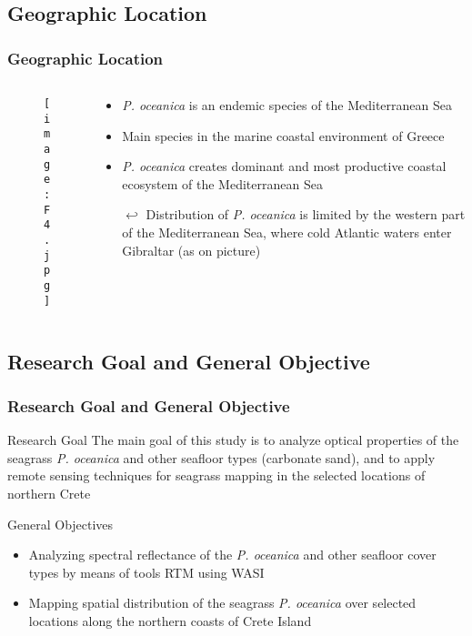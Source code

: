 \documentclass[pdflatex,compress,9pt,
	xcolor={dvipsnames,dvipsnames,svgnames,x11names,table},
	hyperref={colorlinks = true,breaklinks = true, urlcolor = NavyBlue, breaklinks = true}]{beamer}
\begin{document}
\subsection{Geographic Location}
\begin{frame}\frametitle{Geographic Location}
\begin{minipage}[0.4\textheight]{\textwidth}
\begin{columns}[T]
\begin{column}{0.5\textwidth}
\vspace{4em}
\begin{figure}[H]
	\centering
		\texttt{[image: F4.jpg]}
\end{figure}
\end{column}
\begin{column}{0.5\textwidth}
\vspace{4em} 
\begin{itemize}
	\item \emph{P. oceanica} is an endemic species of the Mediterranean Sea
	\item Main species in the marine coastal environment of Greece
	\item \emph{P. oceanica} creates dominant and most productive coastal ecosystem of the Mediterranean Sea
	\item [$\hookleftarrow$] Distribution of \emph{P. oceanica} is limited by the western part of the Mediterranean Sea, where cold Atlantic waters enter Gibraltar (as on picture)
\end{itemize}
\end{column}
\end{columns}
\end{minipage}
\end{frame}

\subsection{Research Goal and General Objective}
\begin{frame}\frametitle{Research Goal and General Objective}

\begin{alertblock}{Research Goal}
The main goal of this study is to analyze optical properties of the seagrass \emph{P. oceanica} and other seafloor types (carbonate sand), and to apply remote sensing techniques for seagrass mapping in the selected locations of northern Crete
\end{alertblock}

\begin{block}{General Objectives}
\begin{itemize}
	\item Analyzing spectral reflectance of the \emph{P. oceanica} and other seafloor cover types by means of  tools \ac{RTM} using \ac{WASI}
	\item Mapping spatial distribution of the seagrass \emph{P. oceanica} over selected locations along the northern coasts of Crete Island
\end{itemize}
\end{block}

\end{frame}
\end{document}
